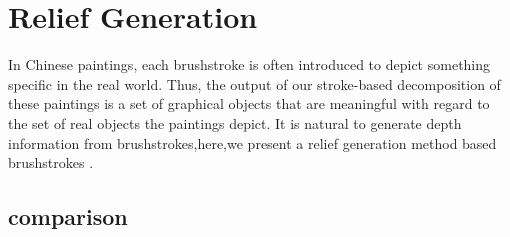 
\section{ Relief Generation}

In Chinese paintings, each brushstroke is often introduced to depict something specific in the real world.
Thus, the output of our stroke-based decomposition of these paintings is a set of graphical objects that are meaningful with regard to the set of real objects the paintings depict. It is natural to generate depth information from brushstrokes,here,we present a relief generation method based brushstrokes  \cite{xu2006animating} . \\


\subsection{comparison}

